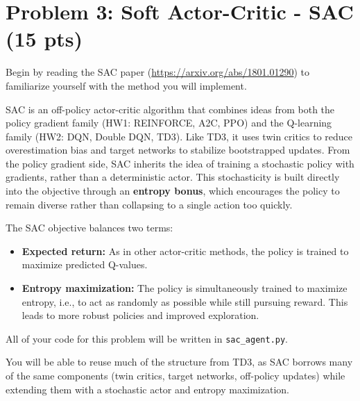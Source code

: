 \documentclass[12pt]{article}
\begin{document}
\section*{Problem 3: Soft Actor-Critic - SAC (15 pts)}

Begin by reading the SAC paper (\url{https://arxiv.org/abs/1801.01290}) to familiarize yourself with the method you will implement.

SAC is an off-policy actor-critic algorithm that combines ideas from both the policy gradient family (HW1: REINFORCE, A2C, PPO) and the Q-learning family (HW2: DQN, Double DQN, TD3). Like TD3, it uses twin critics to reduce overestimation bias and target networks to stabilize bootstrapped updates. From the policy gradient side, SAC inherits the idea of training a stochastic policy with gradients, rather than a deterministic actor. This stochasticity is built directly into the objective through an \textbf{entropy bonus}, which encourages the policy to remain diverse rather than collapsing to a single action too quickly.


The SAC objective balances two terms:
\begin{itemize}
    \item \textbf{Expected return:} As in other actor-critic methods, the policy is trained to maximize predicted Q-values.
    \item \textbf{Entropy maximization:} The policy is simultaneously trained to maximize entropy, i.e., to act as randomly as possible while still pursuing reward. This leads to more robust policies and improved exploration.
\end{itemize}


All of your code for this problem will be written in \texttt{sac\_agent.py}.  

You will be able to reuse much of the structure from TD3, as SAC borrows many of the same components (twin critics, target networks, off-policy updates) while extending them with a stochastic actor and entropy maximization.
\end{document}
